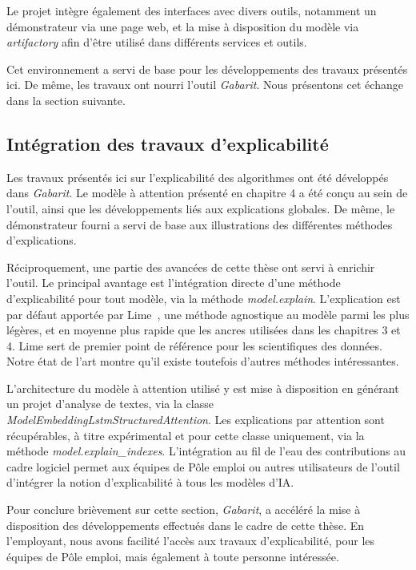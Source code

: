 Le projet intègre également des interfaces avec divers outils, notamment un démonstrateur via une page web, et la mise à disposition du modèle via \textit{artifactory} afin d'être utilisé dans différents services et outils.

Cet environnement a servi de base pour les développements des travaux présentés ici. De même, les travaux ont nourri l'outil \textit{Gabarit}. Nous présentons cet échange dans la section suivante.

\subsection{Intégration des travaux d'explicabilité}

Les travaux présentés ici sur l'explicabilité des algorithmes ont été développés dans \textit{Gabarit}. Le modèle à attention présenté en chapitre 4 a été conçu au sein de l'outil, ainsi que les développements liés aux explications globales. De même, le démonstrateur fourni a servi de base aux illustrations des différentes méthodes d'explications.

Réciproquement, une partie des avancées de cette thèse ont servi à enrichir l'outil. Le principal avantage est l'intégration directe d'une méthode d'explicabilité pour tout modèle, via la méthode \textit{model.explain}. L'explication est par défaut apportée par Lime~\cite{Ribeiro2016}, une méthode agnostique au modèle parmi les plus légères, et en moyenne plus rapide que les ancres utilisées dans les chapitres 3 et 4. Lime sert de premier point de référence pour les scientifiques des données. Notre état de l'art montre qu'il existe toutefois d'autres méthodes intéressantes.

L'architecture du modèle à attention utilisé y est mise à disposition en générant un projet d'analyse de textes, via la classe \textit{ModelEmbeddingLstmStructuredAttention}. Les explications par attention sont récupérables, à titre expérimental et pour cette classe uniquement, via la méthode \textit{model.explain\_indexes}. %
L'intégration au fil de l'eau des contributions au cadre logiciel permet aux équipes de Pôle emploi ou autres utilisateurs de l'outil d'intégrer la notion d'explicabilité à tous les modèles d'IA.

Pour conclure brièvement sur cette section, \textit{Gabarit}, a accéléré la mise à disposition des développements effectués dans le cadre de cette thèse. En l'employant, nous avons facilité l'accès aux travaux d'explicabilité, pour les équipes de Pôle emploi, mais également à toute personne intéressée.

